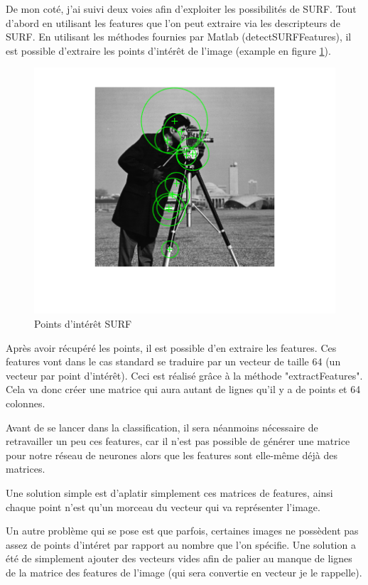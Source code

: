 De mon coté, j'ai suivi deux voies afin d'exploiter les possibilités de SURF. Tout d'abord en utilisant les features que l'on peut extraire via les descripteurs de SURF. En utilisant les méthodes fournies par Matlab (detectSURFFeatures), il est possible d'extraire les points d'intérêt de l'image (example en figure \ref{fig:surffeaturesexample}).

\begin{figure}[h]
\centering
\includegraphics{pictures/DetectSURFFeaturesExample_01.png}
\caption{Points d'intérêt SURF}
\label{fig:surffeaturesexample}
\end{figure}

Après avoir récupéré les points, il est possible d'en extraire les features. Ces features vont dans le cas standard se traduire par un vecteur de taille 64 (un vecteur par point d'intérêt). Ceci est réalisé grâce à la méthode "extractFeatures". Cela va donc créer une matrice qui aura autant de lignes qu'il y a de points et 64 colonnes.

Avant de se lancer dans la classification, il sera néanmoins nécessaire de retravailler un peu ces features, car il n'est pas possible de générer une matrice pour notre réseau de neurones alors que les features sont elle-même déjà des matrices.

Une solution simple est d'aplatir simplement ces matrices de features, ainsi chaque point n'est qu'un morceau du vecteur qui va représenter l'image.

Un autre problème qui se pose est que parfois, certaines images ne possèdent pas assez de points d'intéret par rapport au nombre que l'on spécifie. Une solution a été de simplement ajouter des vecteurs vides afin de palier au manque de lignes de la matrice des features de l'image (qui sera convertie en vecteur je le rappelle).

